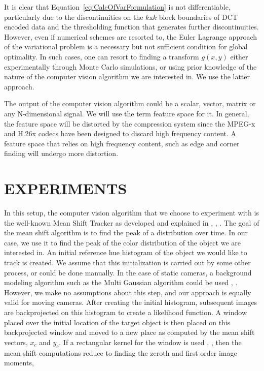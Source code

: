 \documentclass{article}
\begin{document}
It is clear that Equation~\ref{eq:CalcOfVarFormulation} is not differentiable, particularly due to the discontinuities on the $k$x$k$ block boundaries of DCT encoded data and the thresholding function that generates further discontinuities.  However, even if numerical schemes are resorted to, the Euler Lagrange approach of the variational problem is a necessary but not sufficient condition for global optimality.  In such cases, one can resort to finding a transform $g(x,y)$ either experimentally through Monte Carlo simulations, or using prior knowledge of the nature of the computer vision algorithm we are interested in.  We use the latter approach.  

The output of the computer vision algorithm could be a scalar, vector, matrix or any N-dimensional signal.  We will use the term feature space for it.  In general, the feature space will be distorted by the compression system since the MPEG-x and H.26x codecs have been designed to discard high frequency content.  A feature space that relies on high frequency content, such as edge and corner finding will undergo more distortion.  


\section{EXPERIMENTS}

In this setup, the computer vision algorithm that we choose to experiment with is the well-known Mean Shift Tracker as developed and explained in \cite{2003_JNL_TRKkernel_Comaniciu}, \cite{1998_JNL_FaceObjectTracking_Bradski}, \cite{2008_BOOK_OpenCV_Bradski}.  The goal of the mean shift algorithm is to find the peak of a distribution over time.  In our case, we use it to find the peak of the color distribution of the object we are interested in.  An initial reference hue histogram of the object we would like to track is created.  We assume that this initialization is carried out by some other process, or could be done manually.  In the case of static cameras, a background modeling algorithm such as the Multi Gaussian algorithm could be used \cite{2000_JNL_MG_Stauffer}, \cite{2005_JNL_SURVEYchangeDetection_Radke}.  However, we make no assumptions about this step, and our approach is equally valid for moving cameras.  After creating the initial histogram, subsequent images are backprojected on this histogram to create a likelihood function.  A window placed over the initial location of the target object is then placed on this backprojected window and moved to a new place as computed by the mean shift vectors, $x_c$ and $y_c$.    If a rectangular kernel for the window is used \cite{1998_JNL_FaceObjectTracking_Bradski}, \cite{2008_BOOK_OpenCV_Bradski}, then the mean shift computations reduce to finding the zeroth and first order image moments,
\end{document}
